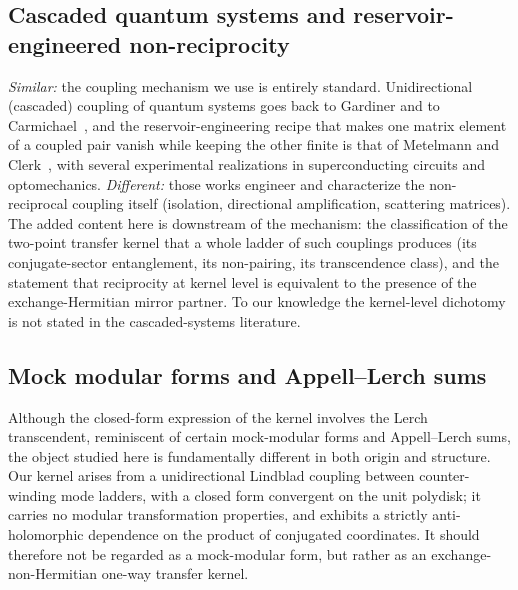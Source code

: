 \documentclass[11pt,a4paper]{article}
\begin{document}
\subsection{Cascaded quantum systems and reservoir-engineered non-reciprocity}

\emph{Similar:} the coupling mechanism we use is entirely standard.
Unidirectional (cascaded) coupling of quantum systems goes back to Gardiner and
to Carmichael~\cite{Gardiner1993,Carmichael1993}, and the reservoir-engineering
recipe that makes one matrix element of a coupled pair vanish while keeping the
other finite is that of Metelmann and Clerk~\cite{MetelmannClerk2015}, with
several experimental realizations in superconducting circuits and
optomechanics. \emph{Different:} those works engineer and characterize the
non-reciprocal coupling itself (isolation, directional amplification,
scattering matrices). The added content here is downstream of the mechanism:
the classification of the two-point transfer kernel that a whole ladder of such
couplings produces (its conjugate-sector entanglement, its non-pairing, its
transcendence class), and the statement that reciprocity at kernel level is
equivalent to the presence of the exchange-Hermitian mirror partner. To our
knowledge the kernel-level dichotomy is not stated in the cascaded-systems
literature.

\subsection{Mock modular forms and Appell--Lerch sums}
\label{sec:mock}

Although the closed-form expression of the kernel involves the Lerch
transcendent, reminiscent of certain mock-modular forms and Appell--Lerch sums,
the object studied here is fundamentally different in both origin and
structure. Our kernel arises from a unidirectional Lindblad coupling between
counter-winding mode ladders, with a closed form convergent on the unit
polydisk; it carries no modular transformation properties, and exhibits a
strictly anti-holomorphic dependence on the product of conjugated coordinates.
It should therefore not be regarded as a mock-modular form, but rather as an
exchange-non-Hermitian one-way transfer kernel.
\end{document}
